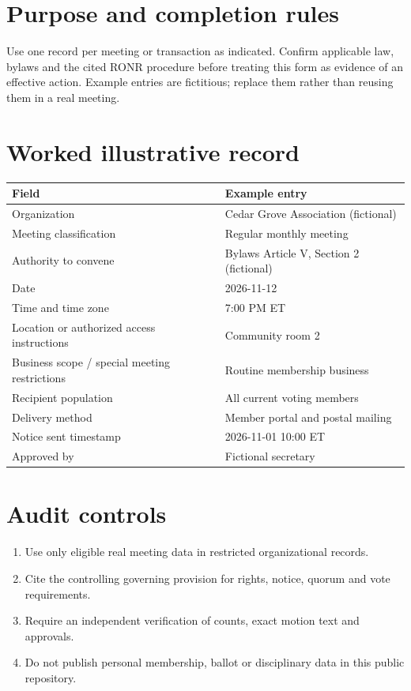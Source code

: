 \documentclass[11pt]{article}
\begin{document}
\SuiteOpen
\section{Purpose and completion rules}
Use one record per meeting or transaction as indicated. Confirm applicable law, bylaws and the cited RONR procedure before treating this form as evidence of an effective action. Example entries are fictitious; replace them rather than reusing them in a real meeting.

\section{Worked illustrative record}
\begin{longtable}{@{}p{.38\linewidth}p{.55\linewidth}@{}}\toprule Field & Example entry\\\midrule\endhead


Organization & Cedar Grove Association (fictional)\\
Meeting classification & Regular monthly meeting\\
Authority to convene & Bylaws Article V, Section 2 (fictional)\\
Date & 2026-11-12\\
Time and time zone & 7:00 PM ET\\
Location or authorized access instructions & Community room 2\\
Business scope / special meeting restrictions & Routine membership business\\
Recipient population & All current voting members\\
Delivery method & Member portal and postal mailing\\
Notice sent timestamp & 2026-11-01 10:00 ET\\
Approved by & Fictional secretary\\
\bottomrule\end{longtable}
\section{Audit controls}
\begin{enumerate}[leftmargin=*,itemsep=4pt]
\item Use only eligible real meeting data in restricted organizational records.
\item Cite the controlling governing provision for rights, notice, quorum and vote requirements.
\item Require an independent verification of counts, exact motion text and approvals.
\item Do not publish personal membership, ballot or disciplinary data in this public repository.
\end{enumerate}
\end{document}
